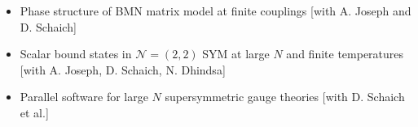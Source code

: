 \renewcommand{\arraystretch}{1.1}

	\begin{itemize}
	 \item Phase structure of BMN matrix model at finite couplings [with A. Joseph and D. Schaich] 
	 \item Scalar bound states in $\mathcal{N}=(2,2)$ SYM at large $N$ and finite temperatures [with A. Joseph, D. Schaich, N. Dhindsa] 
	 \item Parallel software for large $N$ supersymmetric gauge theories [with D. Schaich et al.] 
	  \end{itemize}
